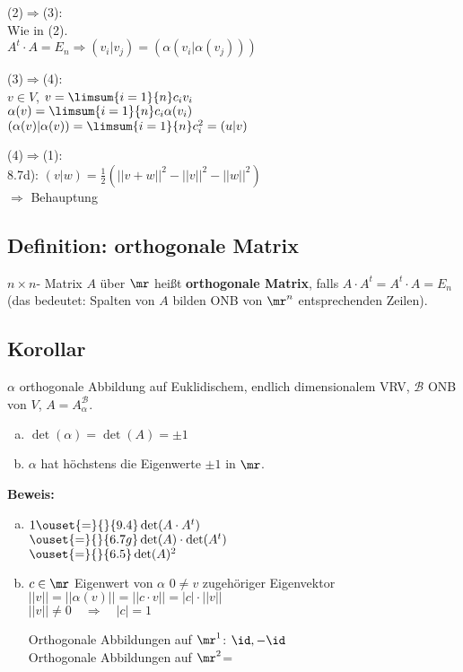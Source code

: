 	(2)$ \Rightarrow $(3):\\
	Wie in (2).\\
	$ A^t\cdot A=E_n\Rightarrow(v_i|v_j)=(\alpha(v_i|\alpha(v_j))) $
	
	(3)$ \Rightarrow $(4):\\
	$ v\in V $, $ v=\limsum{i=1}{n}c_iv_i $\\
	$ \alpha(v)=\limsum{i=1}{n}c_i\alpha(v_i) $\\
	$ (\alpha(v)|\alpha(v))=\limsum{i=1}{n}c_i^2=(u|v) $
	
	(4)$ \Rightarrow $(1):\\
	8.7d): $ (v|w)=\frac{1}{2}(||v+w||^2-||v||^2-||w||^2) $\\
	$ \Rightarrow $ Behauptung
	
\subsection{Definition: orthogonale Matrix}
	$ n\times n $- Matrix $ A $ über $ \mr $ heißt \textbf{orthogonale Matrix}, falls $ A\cdot A^t =A^t\cdot A=E_n$\\
	(das bedeutet: Spalten von $ A $ bilden ONB von $ \mr^n $ entsprechenden Zeilen).
	
\subsection{Korollar}
	$ \alpha $ orthogonale Abbildung auf Euklidischem, endlich dimensionalem VRV, $ \mathcal{B} $ ONB von $ V $, $ A=A_\alpha^{\mathcal{B}} $.
	\begin{enumerate}[a)]
		\item $ \det(\alpha)=\det(A)=\pm 1 $
		\item  $ \alpha $ hat höchstens die Eigenwerte $ \pm 1 $ in $ \mr $.
	\end{enumerate}
	
	\textbf{Beweis:}
	\begin{enumerate}[a)]
		\item $ 1\ouset{=}{}{9.4}\det(A\cdot A^t) $\\
		$ \ouset{=}{}{6.7g}\det(A)\cdot\det(A^t) $\\
		$ \ouset{=}{}{6.5}\det(A)^2 $
		\item $ c\in\mr $ Eigenwert von $ \alpha $ $ 0\neq v $ zugehöriger Eigenvektor\\
		$ ||v||=||\alpha(v)||=||c\cdot v||=|c|\cdot||v|| $\\
		$ ||v||\neq 0\quad\Rightarrow\quad |c|=1 $
		
		Orthogonale Abbildungen auf $ \mr^1 $: $ \id, -\id $\\
		Orthogonale Abbildungen auf $ \mr^2 $=
	\end{enumerate}
	
